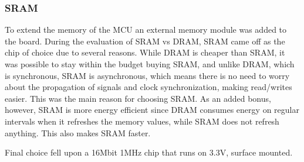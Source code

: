 
\subsubsection{SRAM}

To extend the memory of the MCU an external memory module was added to the
board. During the evaluation of SRAM vs DRAM, SRAM came off as the chip of
choice due to several reasons. While DRAM is cheaper than SRAM, it was possible
to stay within the budget buying SRAM,
and unlike DRAM, which is synchronous, SRAM is asynchronous, which means there
is no need to worry about the propagation of signals and clock synchronization,
making read/writes easier. This was the main reason for choosing SRAM. As an
added bonus, however, SRAM is more energy efficient since DRAM consumes energy
on regular intervals when it refreshes the memory values, while SRAM does not
refresh anything. This also makes SRAM faster.

Final choice fell upon a 16Mbit 1MHz chip that runs on 3.3V, surface mounted.

